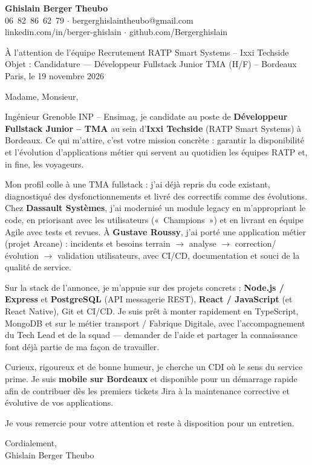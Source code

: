\documentclass[11pt,a4paper]{article}
\begin{document}
{\large\bfseries Ghislain Berger Theubo}\\
06~82~86~62~79 $\cdot$ bergerghislaintheubo@gmail.com\\
linkedin.com/in/berger-ghislain $\cdot$ github.com/Bergerghislain

\vspace{1.2em}
\begin{flushright}
À l'attention de l'équipe Recrutement RATP Smart Systems -- Ixxi Techside\\
Objet : Candidature --- Développeur Fullstack Junior TMA (H/F) -- Bordeaux\\
Paris, le 19 novembre 2026
\end{flushright}

Madame, Monsieur,

Ingénieur Grenoble INP -- Ensimag, je candidate au poste de
\textbf{Développeur Fullstack Junior -- TMA} au sein d'\textbf{Ixxi Techside}
(RATP Smart Systems) à Bordeaux. Ce qui m'attire, c'est votre mission concrète :
garantir la disponibilité et l'évolution d'applications métier qui servent au quotidien
les équipes RATP et, in fine, les voyageurs.

Mon profil colle à une TMA fullstack : j'ai déjà repris du code existant, diagnostiqué des
dysfonctionnements et livré des correctifs comme des évolutions. Chez
\textbf{Dassault Systèmes}, j'ai modernisé un module legacy en m'appropriant le code,
en priorisant avec les utilisateurs («~Champions~») et en livrant en équipe Agile avec tests
et revues. À \textbf{Gustave Roussy}, j'ai porté une application métier (projet Arcane) :
incidents et besoins terrain $\rightarrow$ analyse $\rightarrow$ correction/évolution $\rightarrow$ validation
utilisateurs, avec CI/CD, documentation et souci de la qualité de service.

Sur la stack de l'annonce, je m'appuie sur des projets concrets :
\textbf{Node.js / Express} et \textbf{PostgreSQL} (API messagerie REST),
\textbf{React / JavaScript} (et React Native), Git et CI/CD. Je suis prêt à monter
rapidement en TypeScript, MongoDB et sur le métier transport / Fabrique Digitale, avec
l'accompagnement du Tech Lead et de la squad --- demander de l'aide et partager la connaissance
font déjà partie de ma façon de travailler.

Curieux, rigoureux et de bonne humeur, je cherche un CDI où le sens du service prime.
Je suis \textbf{mobile sur Bordeaux} et disponible pour un démarrage rapide afin
de contribuer dès les premiers tickets Jira à la maintenance corrective et évolutive
de vos applications.

Je vous remercie pour votre attention et reste à disposition pour un entretien.

\vspace{1.2em}
Cordialement,\\[1.2em]
Ghislain Berger Theubo
\end{document}
